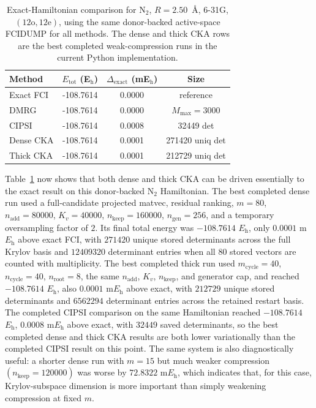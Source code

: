 \documentclass[aip,jcp,preprint,longbibliography]{revtex4-2}
\begin{document}
\begin{table}[htbp]
\caption{Exact-Hamiltonian comparison for \(\mathrm{N}_2\), \(R=2.50\)~\AA, 6-31G, \((12\mathrm{o},12\mathrm{e})\), using the same donor-backed active-space FCIDUMP for all methods. The dense and thick CKA rows are the best completed weak-compression runs in the current Python implementation.}
\label{tab:n2dense}
\begin{ruledtabular}
\begin{tabular}{lccc}
Method & \(E_{\mathrm{tot}}\) (E$_\mathrm{h}$) & \(\Delta_{\mathrm{exact}}\) (mE$_\mathrm{h}$) & Size \\
\hline
Exact FCI & -108.7614 & 0.0000 & reference \\
DMRG & -108.7614 & 0.0000 & \(M_{\max}=3000\) \\
CIPSI & -108.7614 & 0.0008 & 32449 det \\
Dense CKA & -108.7614 & 0.0001 & 271420 uniq det \\
Thick CKA & -108.7614 & 0.0001 & 212729 uniq det \\
\end{tabular}
\end{ruledtabular}
\end{table}

Table~\ref{tab:n2dense} now shows that both dense and thick CKA can be driven essentially to the exact result on this donor-backed \(\mathrm{N}_2\) Hamiltonian. The best completed dense run used a full-candidate projected matvec, residual ranking, \(m=80\), \(n_{\mathrm{add}}=80000\), \(K_v=40000\), \(n_{\mathrm{keep}}=160000\), \(n_{\mathrm{gen}}=256\), and a temporary oversampling factor of \(2\). Its final total energy was \(-108.7614\) \(E_{\mathrm{h}}\), only \(0.0001\) m\(E_{\mathrm{h}}\) above exact FCI, with \(271420\) unique stored determinants across the full Krylov basis and \(12409320\) determinant entries when all \(80\) stored vectors are counted with multiplicity. The best completed thick run used \(m_{\mathrm{cycle}}=40\), \(n_{\mathrm{cycle}}=40\), \(n_{\mathrm{root}}=8\), the same \(n_{\mathrm{add}}\), \(K_v\), \(n_{\mathrm{keep}}\), and generator cap, and reached \(-108.7614\) \(E_{\mathrm{h}}\), also \(0.0001\) m\(E_{\mathrm{h}}\) above exact, with \(212729\) unique stored determinants and \(6562294\) determinant entries across the retained restart basis. The completed CIPSI comparison on the same Hamiltonian reached \(-108.7614\) \(E_{\mathrm{h}}\), \(0.0008\) m\(E_{\mathrm{h}}\) above exact, with \(32449\) saved determinants, so the best completed dense and thick CKA results are both lower variationally than the completed CIPSI result on this point. The same system is also diagnostically useful: a shorter dense run with \(m=15\) but much weaker compression \((n_{\mathrm{keep}}=120000)\) was worse by \(72.8322\) m\(E_{\mathrm{h}}\), which indicates that, for this case, Krylov-subspace dimension is more important than simply weakening compression at fixed \(m\).
\end{document}
